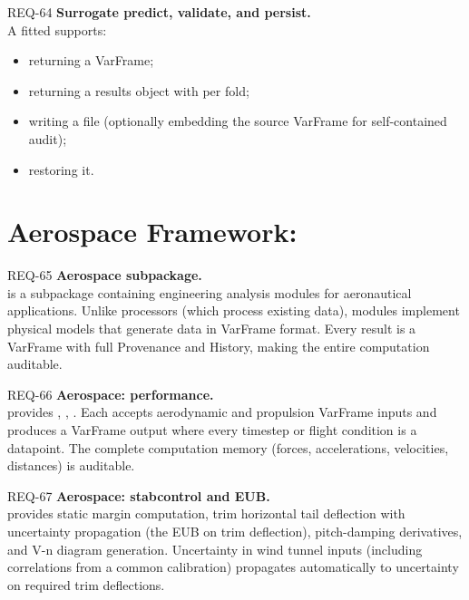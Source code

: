 \begin{reqbox}{REQ-64}{\stable}
\textbf{Surrogate predict, validate, and persist.}\\
A fitted  supports:
\begin{itemize}[noitemsep,topsep=2pt]
  \item {} returning a VarFrame;
  \item {} returning a results object with
     per fold;
  \item {} writing a
     file (optionally embedding the source VarFrame for
    self-contained audit);
  \item {} restoring it.
\end{itemize}
\end{reqbox}

\section{Aerospace Framework: }

\begin{reqbox}{REQ-65}{\draft}
\textbf{Aerospace subpackage.}\\
 is a subpackage containing engineering analysis
modules for aeronautical applications. Unlike  processors
(which process existing data),  modules implement
physical models that generate data in VarFrame format. Every result is a
VarFrame with full Provenance and History, making the entire computation
auditable.
\end{reqbox}

\begin{reqbox}{REQ-66}{\draft}
\textbf{Aerospace: performance.}\\
 provides ,
, . Each accepts aerodynamic
and propulsion VarFrame inputs and produces a VarFrame output where every
timestep or flight condition is a datapoint. The complete computation
memory (forces, accelerations, velocities, distances) is auditable.
\end{reqbox}

\begin{reqbox}{REQ-67}{\draft}
\textbf{Aerospace: stabcontrol and EUB.}\\
 provides static margin computation, trim
horizontal tail deflection with uncertainty propagation (the EUB on trim
deflection), pitch-damping derivatives, and V-n diagram generation.
Uncertainty in wind tunnel inputs (including correlations from a common
calibration) propagates automatically to uncertainty on required trim
deflections.
\end{reqbox}

